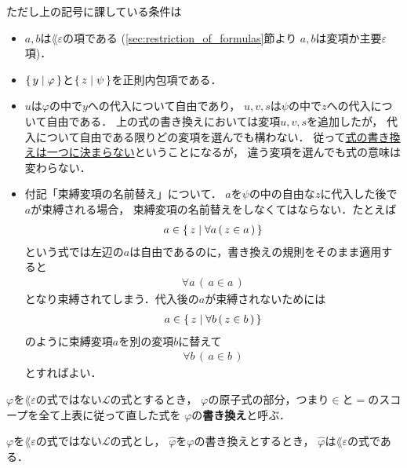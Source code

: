 	ただし上の記号に課している条件は
	\begin{itemize}
		\item $a,b$は$\lang{\varepsilon}$の項である
			(\ref{sec:restriction_of_formulas}節より
			$a,b$は変項か主要$\varepsilon$項)．
		
		\item $\{\, y \mid \varphi\, \}$と$\{\, z \mid \psi\, \}$を正則内包項である．
		
		\item $u$は$\varphi$の中で$y$への代入について自由であり，
			$u,v,s$は$\psi$の中で$z$への代入について自由である．
			上の式の書き換えにおいては変項$u,v,s$を追加したが，
			代入について自由である限りどの変項を選んでも構わない．
			従って\underline{式の書き換えは一つに決まらない}ということになるが，
			違う変項を選んでも式の意味は変わらない．
			
		\item 付記「束縛変項の名前替え」について．
			$a$を$\psi$の中の自由な$z$に代入した後で$a$が束縛される場合，
			束縛変項の名前替えをしなくてはならない．たとえば
			\begin{align}
				a \in \{\, z \mid \forall a\, (\, z \in a\, )\, \}
			\end{align}
			という式では左辺の$a$は自由であるのに，書き換えの規則をそのまま適用すると
			\begin{align}
				\forall a\, (\, a \in a\, )
			\end{align}
			となり束縛されてしまう．代入後の$a$が束縛されないためには
			\begin{align}
				a \in \{\, z \mid \forall b\, (\, z \in b\, )\, \}
			\end{align}
			のように束縛変項$a$を別の変項$b$に替えて
			\begin{align}
				\forall b\, (\, a \in b\, )
			\end{align}
			とすればよい．
	\end{itemize}
	
	\begin{screen}
		\begin{metadfn}[式の書き換え]
			$\varphi$を$\lang{\varepsilon}$の式ではない$\mathcal{L}$の式とするとき，
			$\varphi$の原子式の部分，つまり$\in$と$=$のスコープを全て上表に従って直した式を
			$\varphi$の{\bf 書き換え}と呼ぶ．
		\end{metadfn}
	\end{screen}
	
	\begin{screen}
		\begin{metathm}
		\label{metathm:rewritten_formulas_are_of_L_epsilon}
			$\varphi$を$\lang{\varepsilon}$の式ではない$\mathcal{L}$の式とし，
			$\hat{\varphi}$を$\varphi$の書き換えとするとき，
			$\hat{\varphi}$は$\lang{\varepsilon}$の式である．
		\end{metathm}
	\end{screen}
	
